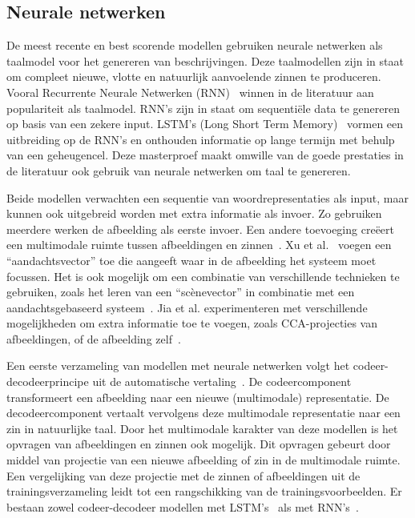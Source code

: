 \subsection{Neurale netwerken}
De meest recente en best scorende modellen gebruiken neurale netwerken als taalmodel voor het genereren van beschrijvingen. Deze taalmodellen zijn in staat om compleet nieuwe, vlotte en natuurlijk aanvoelende zinnen te produceren. Vooral Recurrente Neurale Netwerken (RNN)~\cite{Mikolov2010} winnen in de literatuur aan populariteit als taalmodel. RNN's zijn in staat om sequenti\"ele data te genereren op basis van een zekere input. LSTM's (Long Short Term Memory)~\cite{SeppHochreiter1997} vormen een uitbreiding op de RNN's en onthouden informatie op lange termijn met behulp van een geheugencel. Deze masterproef maakt omwille van de goede prestaties in de literatuur ook gebruik van neurale netwerken om taal te genereren.

Beide modellen verwachten een sequentie van woordrepresentaties als input, maar kunnen ook uitgebreid worden met extra informatie als invoer. Zo gebruiken meerdere werken de afbeelding als eerste invoer. Een andere toevoeging cre\"eert een multimodale ruimte tussen afbeeldingen en zinnen~\cite{Kiros2014,Socher2014}. Xu et al.~\cite{Xu2015} voegen een ``aandachtsvector'' toe die aangeeft waar in de afbeelding het systeem moet focussen. Het is ook mogelijk om een combinatie van verschillende technieken te gebruiken, zoals het leren van een ``sc\`enevector'' in combinatie met een aandachtsgebaseerd systeem~\cite{Jin2015}. Jia et al. experimenteren met verschillende mogelijkheden om extra informatie toe te voegen, zoals CCA-projecties van afbeeldingen, of de afbeelding zelf~\cite{Fernando2015}.

Een eerste verzameling van modellen met neurale netwerken volgt het codeer-decodeerprincipe uit de automatische vertaling~\cite{Kiros2014}. De codeercomponent transformeert een afbeelding naar een nieuwe (multimodale) representatie. De decodeercomponent vertaalt vervolgens deze multimodale representatie naar een zin in natuurlijke taal. Door het multimodale karakter van deze modellen is het opvragen van afbeeldingen en zinnen ook mogelijk. Dit opvragen gebeurt door middel van projectie van een nieuwe afbeelding of zin in de multimodale ruimte. Een vergelijking van deze projectie met de zinnen of afbeeldingen uit de trainingsverzameling leidt tot een rangschikking van de trainingsvoorbeelden. Er bestaan zowel codeer-decodeer modellen met LSTM's~\cite{Kiros2014} als met RNN's~\cite{Karpathy2014,Mao2014a}.

